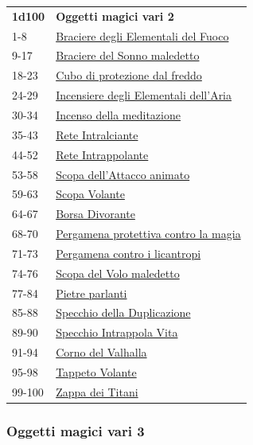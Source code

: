 \begin{multicols}{2}
{{\small\begin{tabularx}{0.45\textwidth}{lX}
\textbf{1d100} & \textbf{Oggetti magici vari 2}\\
1-8 &\hyperlink{Braciere degli Elementali del Fuoco}{Braciere degli Elementali del Fuoco}\\
9-17 &\hyperlink{BracieredelSonnomaledetto}{Braciere del Sonno maledetto}\\
18-23 & \hyperlink{Cubodiprotezionedalfreddo}{Cubo di protezione dal freddo}\\
24-29 & \hyperlink{IncensieredegliElementalidell'Aria}{Incensiere degli Elementali dell'Aria}\\
30-34 & \hyperlink{Incensodellameditazione}{Incenso della meditazione}\\
35-43 & \hyperlink{ReteIntralciante}{Rete Intralciante}\\
44-52 & \hyperlink{ReteIntrappolante}{Rete Intrappolante}\\
53-58 & \hyperlink{Scopadell'Attaccoanimato}{Scopa dell'Attacco animato}\\
59-63 & \hyperlink{ScopaVolante}{Scopa Volante}\\
64-67 & \hyperlink{BorsaDivorante}{Borsa Divorante}\\
68-70 & \hyperlink{Pergamenaprotettivacontrolamagia}{Pergamena protettiva contro la magia}\\
71-73 & \hyperlink{Pergamenacontroilicantropi}{Pergamena contro i licantropi}\\
74-76 & \hyperlink{ScopadelVolomaledetto}{Scopa del Volo maledetto}\\
77-84 & \hyperlink{Pietreparlanti}{Pietre parlanti}\\
85-88 & \hyperlink{SpecchiodellaDuplicazione}{Specchio della Duplicazione}\\
89-90 & \hyperlink{SpecchioIntrappolaVita}{Specchio Intrappola Vita}\\
91-94 & \hyperlink{CornodelValhalla}{Corno del Valhalla}\\
95-98 & \hyperlink{TappetoVolante}{Tappeto Volante}\\
99-100 & \hyperlink{ZappadeiTitani}{Zappa dei Titani}
\end{tabularx}}

\subsubsection{Oggetti magici vari 3}\hypertarget{Oggetti Magici Vari 3}{}

}
\end{multicols}
